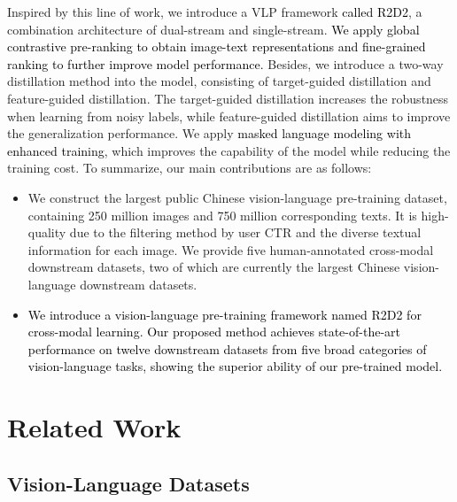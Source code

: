 \documentclass[sigconf]{acmart}
\def\blue{\textcolor{black}}
\def\mmxie{\textcolor{black}}
\def\mmcr{\textcolor{black}}
\begin{document}
Inspired by this line of work, we introduce a VLP framework \mmcr{called R2D2}, a combination architecture of dual-stream and single-stream.
\mmcr{We apply global contrastive pre-ranking to obtain image-text representations and fine-grained ranking to further improve model performance.}
Besides, we introduce a two-way distillation method into the model, consisting of target-guided distillation and feature-guided distillation. The target-guided distillation increases the robustness when learning from noisy labels, while feature-guided distillation aims to improve the generalization performance.
We apply \mmcr{masked language modeling with enhanced training}, which improves the capability of the model while reducing the training cost.
To summarize, our main contributions are as follows:











\begin{itemize}[leftmargin=*]
    \item We construct the largest public Chinese vision-language pre-training dataset, containing 250 million images and 750 million corresponding texts. It is high-quality due to the filtering method by user CTR and the diverse textual information for each image.
    We provide five human-annotated cross-modal downstream datasets, two of which are currently the largest Chinese vision-language downstream datasets.
\item \mmxie{We introduce a vision-language pre-training framework named \mmcr{R2D2} for cross-modal learning. Our proposed method achieves state-of-the-art performance on \blue{twelve downstream datasets from five broad categories of vision-language tasks,} showing the superior ability of our pre-trained model.}
\end{itemize}






\section{Related Work}

\subsection{Vision-Language Datasets}
\end{document}
